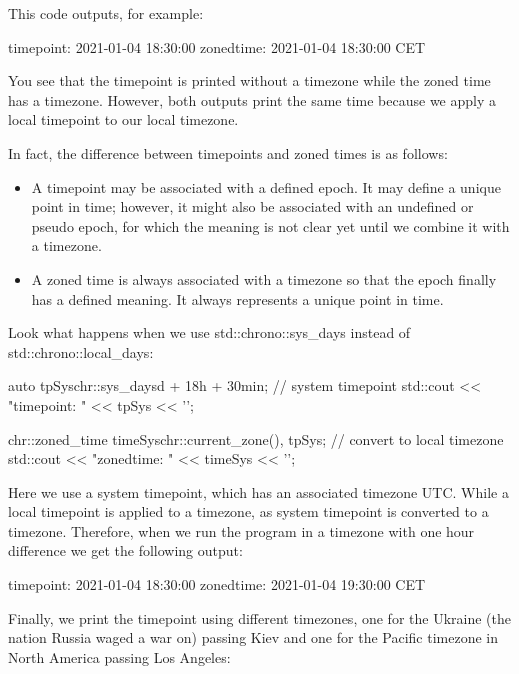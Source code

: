 This code outputs, for example:

\begin{shell}
timepoint: 2021-01-04 18:30:00
zonedtime: 2021-01-04 18:30:00 CET
\end{shell}

You see that the timepoint is printed without a timezone while the zoned time has a timezone. However, both outputs print the same time because we apply a local timepoint to our local timezone.

In fact, the difference between timepoints and zoned times is as follows:

\begin{itemize}
\item 
A timepoint may be associated with a defined epoch. It may define a unique point in time; however, it might also be associated with an undefined or pseudo epoch, for which the meaning is not clear yet until we combine it with a timezone.

\item 
A zoned time is always associated with a timezone so that the epoch finally has a defined meaning. It always represents a unique point in time.
\end{itemize}

Look what happens when we use std::chrono::sys\_days instead of std::chrono::local\_days:

\begin{cpp}
auto tpSys{chr::sys_days{d} + 18h + 30min}; // system timepoint
std::cout << "timepoint: " << tpSys << '\n';

chr::zoned_time timeSys{chr::current_zone(), tpSys}; // convert to local timezone
std::cout << "zonedtime: " << timeSys << '\n';
\end{cpp}

Here we use a system timepoint, which has an associated timezone UTC. While a local timepoint is applied to a timezone, as system timepoint is converted to a timezone. Therefore, when we run the program in a timezone with one hour difference we get the following output:

\begin{shell}
timepoint: 2021-01-04 18:30:00
zonedtime: 2021-01-04 19:30:00 CET
\end{shell}


Finally, we print the timepoint using different timezones, one for the Ukraine (the nation Russia waged a war on) passing Kiev and one for the Pacific timezone in North America passing Los Angeles:

